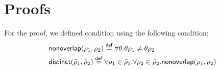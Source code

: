 \appendix
\section{Proofs}

For the proof, we defined condition \disjoint{} using the following
\nonoverlap{} condition:
\begin{align*}
  & {\sf nonoverlap}(\rho_1,\rho_2) \overset{{\sf def}}{=} 
  \forall \theta. \theta \rho_1 \ne \theta \rho_2
  \\
  & {\sf distinct}(\bar{\rho}_1,\bar{\rho}_2) \overset{{\sf def}}{=} 
    \forall \rho_1 \in \bar{\rho}_1.\forall \rho_2 \in
    \bar{\rho}_2. 
    {\sf nonoverlap}(\rho_1, \rho_2)
\end{align*}

\label{sec:appendix}

\lempredstable

